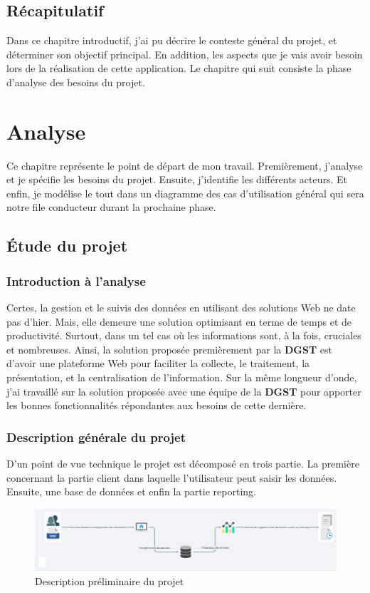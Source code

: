 \documentclass[a4paper]{report}
\begin{document}
\begin{doublespace}
	\section{Récapitulatif}
	Dans ce chapitre introductif, j'ai pu décrire le conteste général du
	projet, et
	déterminer son objectif principal. En addition, les aspects que je vais
	avoir besoin lors de la réalisation de cette application.
	Le chapitre qui suit consiste la phase d'analyse des besoins du projet.
	\newpage
	\chapter{Analyse}
	\renewcommand{\headrulewidth}{1pt}
	\fancyhead[L]{\hspace*{5cm}}

	Ce chapitre représente le point de départ de mon travail. Premièrement,
	j'analyse et
	je spécifie les besoins du projet. Ensuite, j'identifie les différents
	acteurs. Et enfin, je
	modélise le tout dans un diagramme des cas d’utilisation général qui
	sera notre file conducteur
	durant la prochaine phase.
	\section{Étude du projet}
	\subsection{Introduction à l'analyse}
	Certes, la gestion et le suivis des données en utilisant des solutions
	Web ne date pas d'hier. Mais,
	elle demeure une solution optimisant en terme de temps et de
	productivité. Surtout,
	dans un tel cas où les informations sont, à la fois, cruciales et
	nombreuses. Ainsi, la solution proposée premièrement par la \textbf{DGST} est
	d'avoir une plateforme Web pour faciliter la collecte,
	le traitement, la présentation, et la centralisation de l'information.
	Sur la même longueur d'onde, j'ai
	travaillé sur la solution proposée avec une équipe de la \textbf{DGST}
	pour apporter les bonnes
	fonctionnalités répondantes aux besoins de cette dernière.
	\subsection{Description générale du projet}
	D'un point de vue technique le projet est décomposé en trois partie. La
	première concernant la partie client dans laquelle l'utilisateur peut saisir
	les données. Ensuite, une base de données et enfin la partie reporting.
	\begin{figure}[H]
		\begin{center}
			\includegraphics[scale=0.2]{images/pre-descip-projet.png}
			\caption{Description préliminaire du projet}
		\end{center}
	\end{figure}

\end{doublespace}
\end{document}
